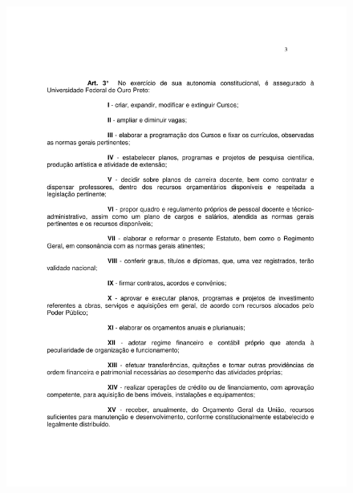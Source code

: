 \begin{figure}[p]
	\centering 
	\includegraphics[scale=0.7]{capitulos/resolucoes/cuni414/cuni414-3.pdf}
\end{figure} \pagebreak

